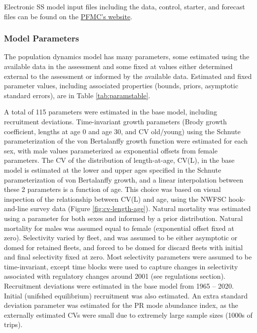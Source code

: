 \documentclass[11pt,
  english,
]{article}
\begin{document}
Electronic SS model input files including the data, control, starter, and forecast files can be found on the {\href{https://www.pcouncil.org/groundfish/stock-assessments/}{PFMC's website}\leavevmode\tagmcend\tagstructend}.


\hypertarget{model-parameters}{%
\subsubsection{Model Parameters}\label{model-parameters}}

\leavevmode\tagmcend\tagstructend

The population dynamics model has many parameters, some estimated using the available data in the assessment and some fixed at values either determined external to the assessment or informed by the available data. Estimated and fixed parameter values, including associated properties (bounds, priors, asymptotic standard errors), are in Table \ref{tab:paramstable}.

A total of 115 parameters were estimated in the base model, including recruitment deviations. Time-invariant growth parameters (Brody growth coefficient, lengths at age 0 and age 30, and CV old/young) using the Schnute parameterization of the von Bertalanffy growth function were estimated for each sex, with male values parameterized as exponential offsets from female parameters. The CV of the distribution of length-at-age, CV(L), in the base model is estimated at the lower and upper ages specified in the Schnute parameterization of von Bertalanffy growth, and a linear interpolation between these 2 parameters is a function of age. This choice was based on visual inspection of the relationship between CV(L) and age, using the NWFSC hook-and-line survey data (Figure \ref{fig:cv-length-age}). Natural mortality was estimated using a parameter for both sexes and informed by a prior distribution. Natural mortality for males was assumed equal to female (exponential offset fixed at zero). Selectivity varied by fleet, and was assumed to be either asymptotic or domed for retained fleets, and forced to be domed for discard fleets with initial and final selectivity fixed at zero. Most selectivity parameters were assumed to be time-invariant, except time blocks were used to capture changes in selectivity associated with regulatory changes around 2001 (see regulations section). Recruitment deviations were estimated in the base model from 1965 -- 2020. Initial (unifshed equilibrium) recruitment was also estimated. An extra standard deviation parameter was estimated for the PR mode abundance index, as the externally estimated CVs were small due to extremely large sample sizes (1000s of trips).
\end{document}
